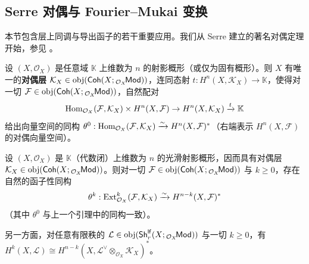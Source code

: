 \subsection{Serre 对偶与 Fourier--Mukai 变换}\label{ch6.4}


本节包含层上同调与导出函子的若干重要应用。我们从 Serre 建立的著名对偶定理开始，参见 \cite[第 III.7 节]{[Har77]}。

\begin{Lem}
	设 $(X,\mathcal{O}_X)$ 是任意域 $\mathbb{K}$ 上维数为 $n$ 的射影概形（或仅为固有概形）。则 $X$ 有唯一的\textbf{对偶层} $\mathcal{K}_X\in\textup{obj}(\mathsf{Coh}(X;{}_{\mathcal{O}_X}\!\mathsf{Mod}))$，连同态射 $t:H^n(X,\mathcal{K}_X)\rightarrow\mathbb{K}$，使得对一切 $\mathcal{F}\in\textup{obj}(\mathsf{Coh}(X;{}_{\mathcal{O}_X}\!\mathsf{Mod}))$，自然配对
	\[
	\textup{Hom}_{\mathcal{O}_X}(\mathcal{F},\mathcal{K}_X)\times H^n(X,\mathcal{F})\rightarrow H^n(X,\mathcal{K}_X)\xrightarrow{t}\mathbb{K}
	\]
	给出向量空间的同构 $\theta^0:\textup{Hom}_{\mathcal{O}_X}(\mathcal{F},\mathcal{K}_X)\xrightarrow{\sim} H^n(X,\mathcal{F})^*$（右端表示 $H^n(X,\mathcal{F})$ 的对偶向量空间）。
\end{Lem}

\begin{Thm}\label{Serreduality}
	设 $(X,\mathcal{O}_X)$ 是 $\mathbb{K}$（代数闭）上维数为 $n$ 的光滑射影概形，因而具有对偶层 $\mathcal{K}_X\in\textup{obj}(\mathsf{Coh}(X;{}_{\mathcal{O}_X}\!\mathsf{Mod}))$。则对一切 $\mathcal{F}\in\textup{obj}(\mathsf{Coh}(X;{}_{\mathcal{O}_X}\!\mathsf{Mod}))$ 与 $k\geq 0$，存在自然的函子性同构
	\begin{equation}
		\theta^k:\textup{Ext}_{\mathcal{O}_X}^k(\mathcal{F},\mathcal{K}_X)\xrightarrow{\sim} H^{n-k}(X,\mathcal{F})^*
	\end{equation}
	（其中 $\theta^0$ 与上一个引理中的同构一致）。

	另一方面，对任意有限秩的 $\mathcal{L}\in\textup{obj}(\mathsf{Sh}^\mathsf{lf}_r(X;{}_{\mathcal{O}_X}\!\mathsf{Mod}))$ 与一切 $k\geq 0$，有 $H^k(X,\mathcal{L})\cong H^{n-k}(X,\mathcal{L}^\vee\otimes_{\mathcal{O}_X}\! \mathcal{K}_X)^*$。
\end{Thm}


